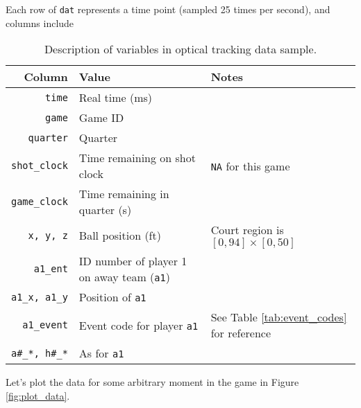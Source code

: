 \documentclass{article}\usepackage[]{graphicx}\usepackage[]{color}
\begin{document}
Each row of \texttt{dat} represents a time point (sampled 25 times per second), and columns include
\begin{table}[!h]
\begin{center}
\begin{tabular}{r|ll}
\toprule
Column & Value & Notes \\
\midrule
\texttt{time} & Real time (ms) & \\
\texttt{game} & Game ID & \\
\texttt{quarter} & Quarter & \\
\texttt{shot\_clock} & Time remaining on shot clock & \texttt{NA} for this game \\
\texttt{game\_clock} & Time remaining in quarter (s) & \\
\texttt{x, y, z} & Ball position (ft) & Court region is $[0, 94] \times [0, 50]$ \\
\texttt{a1\_ent} & ID number of player 1 on away team (\texttt{a1}) & \\
\texttt{a1\_x, a1\_y} & Position of \texttt{a1} & \\
\texttt{a1\_event} & Event code for player \texttt{a1} &  See Table \ref{tab:event_codes} for reference \\
\texttt{a\#\_*, h\#\_*} & As for \texttt{a1} & \\
\bottomrule
\end{tabular}
\caption{Description of variables in optical tracking data sample.}
\label{tab:data_desc}
\end{center}
\end{table}

Let's plot the data for some arbitrary moment in the game in Figure \ref{fig:plot_data}.
\end{document}
